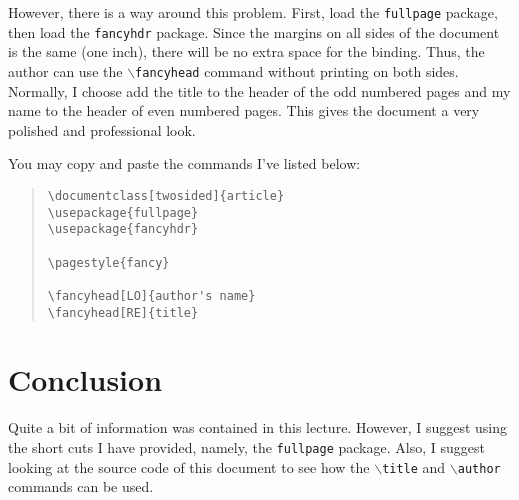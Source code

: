 \documentclass{article}
\begin{document}
However, there is a way around this problem. First, load the \texttt{fullpage} package, then load the \texttt{fancyhdr} package. Since the margins on all sides of the document is the same (one inch), there will be no extra space for the binding. Thus, the author can use the \texttt{$\backslash$fancyhead} command without printing on both sides. Normally, I choose add the title to the header of the odd numbered pages and my name to the header of even numbered pages. This gives the document a very polished and professional look.

You may copy and paste the commands I've listed below:
\begin{quote}
\begin{verbatim}
\documentclass[twosided]{article}
\usepackage{fullpage}
\usepackage{fancyhdr}

\pagestyle{fancy}

\fancyhead[LO]{author's name}
\fancyhead[RE]{title}
\end{verbatim}
\end{quote}

\section{Conclusion}

Quite a bit of information was contained in this lecture. However, I suggest using the short cuts I have provided, namely, the \texttt{fullpage} package. Also, I suggest looking at the source code of this document to see how the \texttt{$\backslash$title} and \texttt{$\backslash$author} commands can be used.
\end{document}
